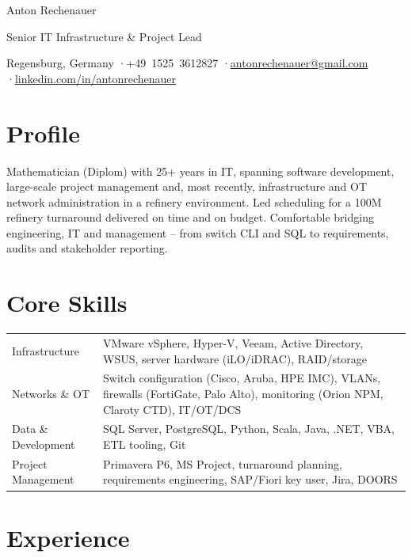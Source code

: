 \documentclass[10pt,a4paper]{article}
\newcommand*{\semibold}{\fontseries{sb}\selectfont}
\newcommand*{\skill}[2]{{\semibold #1} & #2 \\[1.5pt]}
\begin{document}
{\fontsize{26}{28}\selectfont\semibold Anton Rechenauer}\par
\vspace{3pt}
{\large\color{accent} Senior IT Infrastructure \& Project Lead}\par
\vspace{5pt}
{\small\color{muted}
  Regensburg, Germany
  \enspace·\enspace +49~1525~3612827
  \enspace·\enspace \href{mailto:antonrechenauer@gmail.com}{antonrechenauer@gmail.com}
  \enspace·\enspace \href{https://www.linkedin.com/in/antonrechenauer}{linkedin.com/in/antonrechenauer}}\par

\section{Profile}
Mathematician (Diplom) with 25+ years in IT, spanning software development, large-scale project
management and, most recently, infrastructure and OT network administration in a refinery
environment. Led scheduling for a 100M refinery turnaround delivered on time and on budget.
Comfortable bridging engineering, IT and management -- from switch CLI and SQL to
requirements, audits and stakeholder reporting.

\section{Core Skills}
\begin{tabularx}{\linewidth}{@{}p{3.3cm}X@{}}
\skill{Infrastructure}{VMware vSphere, Hyper-V, Veeam, Active Directory, WSUS, server hardware (iLO/iDRAC), RAID/storage}
\skill{Networks \& OT}{Switch configuration (Cisco, Aruba, HPE IMC), VLANs, firewalls (FortiGate, Palo Alto), monitoring (Orion NPM, Claroty CTD), IT/OT/DCS}
\skill{Data \& Development}{SQL Server, PostgreSQL, Python, Scala, Java, .NET, VBA, ETL tooling, Git}
\skill{Project Management}{Primavera P6, MS Project, turnaround planning, requirements engineering, SAP/Fiori key user, Jira, DOORS}
\end{tabularx}

\section{Experience}
\end{document}
